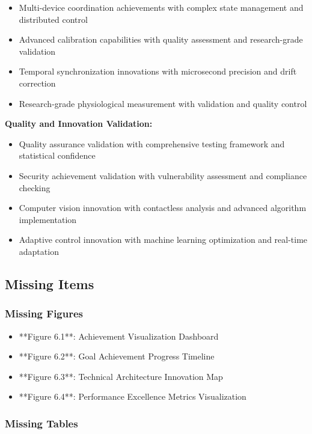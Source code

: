 \documentclass[12pt,a4paper]{article}
\begin{document}
\begin{itemize}
\item Multi-device coordination achievements with complex state management and distributed control
\item Advanced calibration capabilities with quality assessment and research-grade validation
\item Temporal synchronization innovations with microsecond precision and drift correction
\item Research-grade physiological measurement with validation and quality control

\end{itemize}
\textbf{Quality and Innovation Validation:}

\begin{itemize}
\item Quality assurance validation with comprehensive testing framework and statistical confidence
\item Security achievement validation with vulnerability assessment and compliance checking
\item Computer vision innovation with contactless analysis and advanced algorithm implementation
\item Adaptive control innovation with machine learning optimization and real-time adaptation

\end{itemize}
\subsection{Missing Items}

\subsubsection{Missing Figures}

\begin{itemize}
\item **Figure 6.1**: Achievement Visualization Dashboard
\item **Figure 6.2**: Goal Achievement Progress Timeline
\item **Figure 6.3**: Technical Architecture Innovation Map
\item **Figure 6.4**: Performance Excellence Metrics Visualization

\end{itemize}
\subsubsection{Missing Tables}
\end{document}
